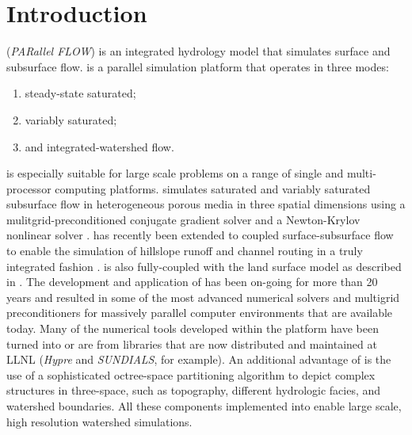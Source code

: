 
\chapter{Introduction}
\label{Introduction}

\parflow{} (\emph{PARallel FLOW}) is an integrated hydrology 
model that simulates surface and subsurface flow.
\parflow{} \cite{Ashby-Falgout90, Jones-Woodward01, KM06, M13} 
is a parallel simulation platform that operates in three modes:\begin{enumerate}
\item
steady-state saturated; 
\item
variably saturated; 
\item
and integrated-watershed flow.
\end{enumerate}
\parflow{} is especially suitable for large scale problems on a range
of single and multi-processor computing platforms. \parflow{}
simulates saturated and variably saturated
subsurface flow in heterogeneous porous media in three spatial
dimensions using a mulitgrid-preconditioned conjugate gradient solver
\cite{Ashby-Falgout90} and a Newton-Krylov nonlinear solver
\cite{Jones-Woodward01}. \parflow{} has recently been extended to
coupled surface-subsurface flow to enable the simulation of hillslope
runoff and channel routing in a truly integrated fashion
\cite{KM06}. \parflow{} is also fully-coupled with the land surface
model  \cite{Dai03} as described in \cite{MM05,KM08a}.  The
development and application of \parflow{} has been on-going for more
than 20 years \cite{Meyerhoff14a, Meyerhoff14b, Meyerhoff11, Mikkelson13,
RMC10, Shrestha14, SNSMM10, Siirila12a,
Siirila12b, SMPMPK10, Williams11, Williams13, FM10, Keyes13, 
KRM10, Condon13a, Condon13b, M13, KRM10, KRM10, SNSMM10, DMC10, AM10,
MLMSWT10, M10, FM10, KMWSVVS10, SMPMPK10, FFKM09, KCSMMB09, MTK09, dBRM08, 
MK08b, KM08b, KM08a, MK08a, MCT08,MCK07,MWH07,
  KM06, MM05, TMCZPS05, MWT03, Teal02, WGM02, Jones-Woodward01, MCT00,
  TCRM99, TBP99, TFSBA98, Ashby-Falgout90} and resulted in some of the
most advanced numerical solvers and multigrid preconditioners for
massively parallel computer environments that are available
today. Many of the numerical tools developed within the \parflow{}
platform have been turned into or are from libraries that are now
distributed and maintained at LLNL ({\em Hypre} and {\em SUNDIALS},
for example).  An additional advantage of \parflow{} is the use of a
sophisticated octree-space partitioning algorithm to depict complex
structures in three-space, such as topography, different hydrologic
facies, and watershed boundaries. All these components implemented
into \parflow{} enable large scale, high resolution watershed
simulations. 

